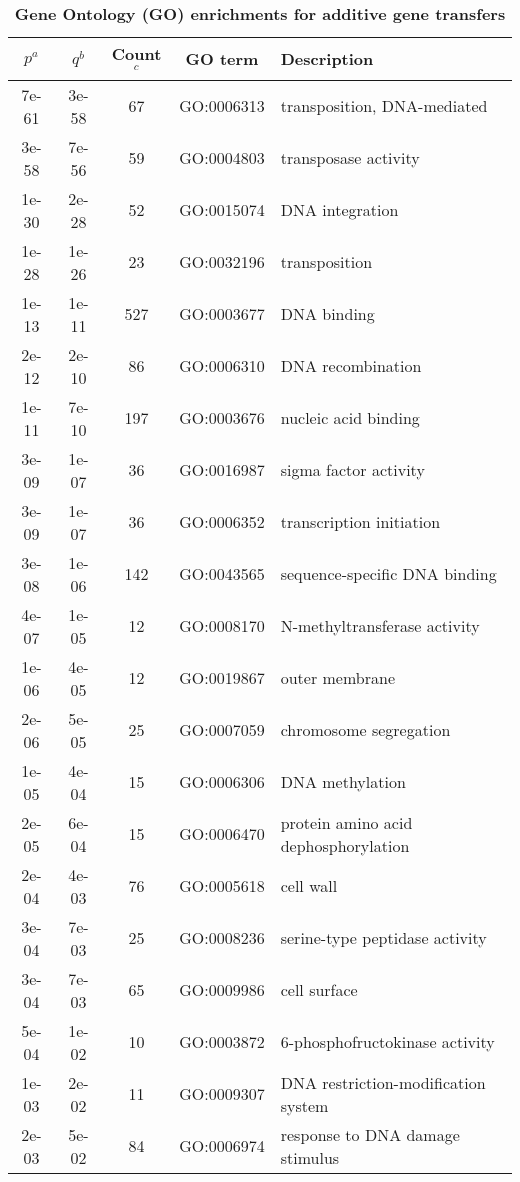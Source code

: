 \documentclass[12pt]{article}
\begin{document}
\begin{table}[!h]

\caption{{\bf Gene Ontology (GO) enrichments for additive gene
  transfers}}
\vspace{1ex}

\noindent \begin{centering}
\begin{tabular}{ccccl}
\hline 
$p^a$ & $q^b$ & Count$^c$ & GO term & Description \\
\hline 
7e-61 & 3e-58 & 67 & GO:0006313 & transposition, DNA-mediated\\
3e-58 & 7e-56 & 59 & GO:0004803 & transposase activity\\
1e-30 & 2e-28 & 52 & GO:0015074 & DNA integration\\
1e-28 & 1e-26 & 23 & GO:0032196 & transposition\\
1e-13 & 1e-11 & 527 & GO:0003677 & DNA binding\\
2e-12 & 2e-10 & 86 & GO:0006310 & DNA recombination\\
1e-11 & 7e-10 & 197 & GO:0003676 & nucleic acid binding\\
3e-09 & 1e-07 & 36 & GO:0016987 & sigma factor activity\\
3e-09 & 1e-07 & 36 & GO:0006352 & transcription initiation\\
3e-08 & 1e-06 & 142 & GO:0043565 & sequence-specific DNA binding\\
4e-07 & 1e-05 & 12 & GO:0008170 & N-methyltransferase activity\\
1e-06 & 4e-05 & 12 & GO:0019867 & outer membrane\\
2e-06 & 5e-05 & 25 & GO:0007059 & chromosome segregation\\
1e-05 & 4e-04 & 15 & GO:0006306 & DNA methylation\\
2e-05 & 6e-04 & 15 & GO:0006470 & protein amino acid dephosphorylation\\
2e-04 & 4e-03 & 76 & GO:0005618 & cell wall\\
3e-04 & 7e-03 & 25 & GO:0008236 & serine-type peptidase activity\\
3e-04 & 7e-03 & 65 & GO:0009986 & cell surface\\
5e-04 & 1e-02 & 10 & GO:0003872 & 6-phosphofructokinase activity\\
1e-03 & 2e-02 & 11 & GO:0009307 & DNA restriction-modification system\\
2e-03 & 5e-02 & 84 & GO:0006974 & response to DNA damage stimulus\\

\end{tabular}
\end{centering}
\end{table}
\end{document}
